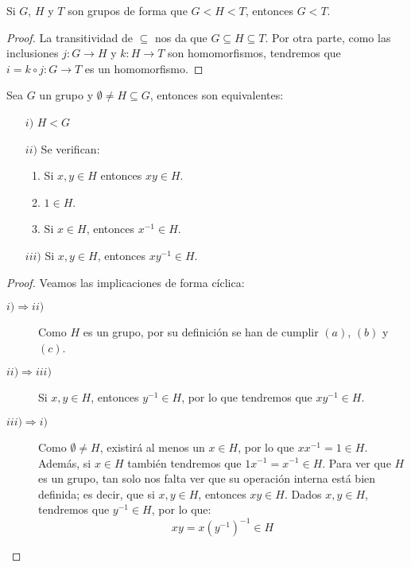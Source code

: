 \begin{observacion}
    Si $G$, $H$ y $T$ son grupos de forma que $G < H < T$, entonces $G < T$.
    \begin{proof}
        La transitividad de $\subseteq $ nos da que $G\subseteq H\subseteq T$. Por otra parte, como las inclusiones $j:G\to H$ y $k:H\to T$ son homomorfismos, tendremos que $i=k\circ j:G\to T$ es un homomorfismo.
    \end{proof}
\end{observacion}

\begin{prop}\label{prop:carac_subgrupo}
    Sea $G$ un grupo y $\emptyset \neq H \subseteq G$, entonces son equivalentes:
    \begin{enumerate}
        \item[$i)$] $H < G$
        \item[$ii)$] Se verifican:
            \begin{enumerate}[label=(\alph*)]
                \item Si $x,y\in H$ entonces $xy\in H$.
                \item $1\in H$.
                \item Si $x\in H$, entonces $x^{-1}\in H$.
            \end{enumerate}
        \item[$iii)$] Si $x,y\in H$, entonces $xy^{-1}\in H$.
    \end{enumerate}
    \begin{proof}
        Veamos las implicaciones de forma cíclica:
        \begin{description}
            \item [$i)\Longrightarrow ii)$] Como $H$ es un grupo, por su definición se han de cumplir $(a)$, $(b)$ y $(c)$.
            \item [$ii)\Longrightarrow iii)$] Si $x,y\in H$, entonces $y^{-1}\in H$, por lo que tendremos que $xy^{-1}\in H$.
            \item [$iii)\Longrightarrow i)$] Como $\emptyset \neq H$, existirá al menos un $x\in H$, por lo que $xx^{-1} = 1 \in H$.
                Además, si $x\in H$ también tendremos que $1x^{-1} = x^{-1}\in H$.
                Para ver que $H$ es un grupo, tan solo nos falta ver que su operación interna está bien definida; es decir, que si $x,y\in H$, entonces $xy\in H$. Dados $x,y\in H$, tendremos que $y^{-1}\in H$, por lo que:
                \begin{equation*}
                    xy = x(y^{-1})^{-1} \in H
                \end{equation*}
                

\end{description}
\end{proof}
\end{prop}
